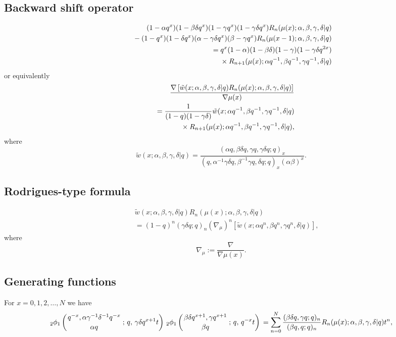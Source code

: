 \documentclass[envcountchap,graybox]{svmono}
\newcommand{\qhyp}[5]{\mbox{}_{#1}{\phi}_{#2}
\left(\genfrac{}{}{0pt}{}{#3}{#4}\,;\,q,\,#5\right)}
\newcommand{\mathindent}{\hspace{7.5mm}}
\begin{document}
\subsection*{Backward shift operator}
\begin{eqnarray}
\label{shift2qRacahI}
& &(1-\alpha q^x)(1-\beta\delta q^x)(1-\gamma q^x)(1-\gamma\delta q^x)R_n(\mu(x);\alpha,\beta,\gamma,\delta|q)\nonumber\\
& &{}\mathindent{}-(1-q^x)(1-\delta q^x)(\alpha-\gamma\delta q^x)(\beta-\gamma q^x)R_n(\mu(x-1);\alpha,\beta,\gamma,\delta|q)\nonumber\\
& &{}=q^x(1-\alpha)(1-\beta\delta)(1-\gamma)(1-\gamma\delta q^{2x})\nonumber\\
& &{}\mathindent\times R_{n+1}(\mu(x);\alpha q^{-1},\beta q^{-1},\gamma q^{-1},\delta|q)
\end{eqnarray}
or equivalently
\begin{eqnarray}
\label{shift2qRacahII}
& &\frac{\nabla\left[{\tilde w}(x;\alpha,\beta,\gamma,\delta|q)R_n(\mu(x);\alpha,\beta,\gamma,\delta|q)\right]}{\nabla\mu(x)}\nonumber\\
& &{}=\frac{1}{(1-q)(1-\gamma\delta)}{\tilde w}(x;\alpha q^{-1},\beta q^{-1},\gamma q^{-1},\delta|q)\nonumber\\
& &{}\mathindent{}\times R_{n+1}(\mu(x);\alpha q^{-1},\beta q^{-1},\gamma q^{-1},\delta|q),
\end{eqnarray}
where
$${\tilde w}(x;\alpha,\beta,\gamma,\delta|q)=\frac{(\alpha q,\beta\delta q,\gamma q,\gamma\delta q;q)_x}
{(q,\alpha^{-1}\gamma\delta q,\beta^{-1}\gamma q,\delta q;q)_x(\alpha\beta)^x}.$$

\subsection*{Rodrigues-type formula}
\begin{eqnarray}
\label{RodqRacah}
& &{\tilde w}(x;\alpha,\beta,\gamma,\delta|q)R_n(\mu(x);\alpha,\beta,\gamma,\delta|q)\nonumber\\
& &{}=(1-q)^n(\gamma\delta q;q)_n\left(\nabla_{\mu}\right)^n
\left[{\tilde w}(x;\alpha q^n,\beta q^n,\gamma q^n,\delta|q)\right],
\end{eqnarray}
where
$$\nabla_{\mu}:=\frac{\nabla}{\nabla\mu(x)}.$$

\subsection*{Generating functions} For $x=0,1,2,\ldots,N$ we have
\begin{equation}
\label{GenqRacah1}
\qhyp{2}{1}{q^{-x},\alpha\gamma^{-1}\delta^{-1}q^{-x}}{\alpha q}{\gamma\delta q^{x+1}t}\,
\qhyp{2}{1}{\beta\delta q^{x+1},\gamma q^{x+1}}{\beta q}{q^{-x}t}
{}=\sum_{n=0}^N\frac{(\beta\delta q,\gamma q;q)_n}{(\beta q,q;q)_n}
R_n(\mu(x);\alpha,\beta,\gamma,\delta|q)t^n,
\end{equation}
\end{document}

